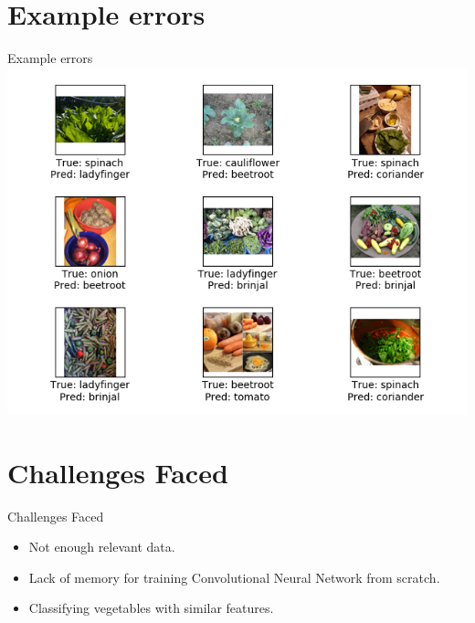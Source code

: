 \documentclass[10pt, a4paper,xcolor=table]{beamer}
\begin{document}
\section{Example errors}
\begin{frame}{Example errors}
	\includegraphics[scale=0.45]{exampleerrors.png}
\end{frame}

\section{Challenges Faced}
\begin{frame}{Challenges Faced}
	\begin{itemize}
		\item Not enough relevant data.
		\item Lack of memory for training Convolutional Neural Network from scratch.
		\item Classifying vegetables with similar features.
	\end{itemize}
\end{frame}
\end{document}
